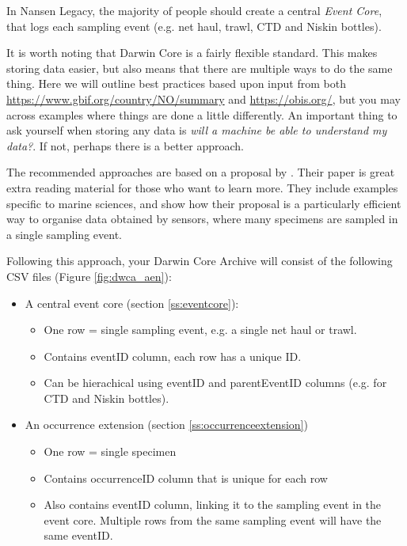 \documentclass[a4paper,english, 11pt]{article}
\begin{document}
In Nansen Legacy, the majority of people should create a central \textit{Event Core}, that logs each sampling event (e.g. net haul, trawl, CTD and Niskin bottles).

It is worth noting that Darwin Core is a fairly flexible standard. This makes storing data easier, but also means that there are multiple ways to do the same thing. Here we will outline best practices based upon input from both \href{GBIF Norway}{https://www.gbif.org/country/NO/summary} and \href{OBIS}{https://obis.org/}, but you may across examples where things are done a little differently. An important thing to ask yourself when storing any data is \textit{will a machine be able to understand my data?}. If not, perhaps there is a better approach.

The recommended approaches are based on a proposal by \cite[][option 6]{de2017toward}. Their paper is great extra reading material for those who want to learn more. They include examples specific to marine sciences, and show how their proposal is a particularly efficient way to organise data obtained by sensors, where many specimens are sampled in a single sampling event.

Following this approach, your Darwin Core Archive will consist of the following CSV files (Figure \ref{fig:dwca_aen}):

\begin{itemize}
\item A central event core (section \ref{ss:eventcore}):
\begin{itemize}
\item One row = single sampling event, e.g. a single net haul or trawl.
\item Contains eventID column, each row has a unique ID.
\item Can be hierachical using eventID and parentEventID columns (e.g. for CTD and Niskin bottles).
\end{itemize}
\item An occurrence extension (section \ref{ss:occurrenceextension})
\begin{itemize}
\item One row = single specimen
\item Contains occurrenceID column that is unique for each row
\item Also contains eventID column, linking it to the sampling event in the event core. Multiple rows from the same sampling event will have the same eventID. 
\end{itemize}
\end{itemize}
\end{document}
